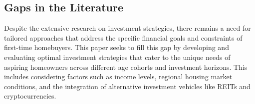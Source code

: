 \subsection{Gaps in the Literature}
Despite the extensive research on investment strategies, there remains a need for tailored approaches that address the specific financial goals and constraints of first-time homebuyers. This paper seeks to fill this gap by developing and evaluating optimal investment strategies that cater to the unique needs of aspiring homeowners across different age cohorts and investment horizons. This includes considering factors such as income levels, regional housing market conditions, and the integration of alternative investment vehicles like REITs and cryptocurrencies.

\newpage
